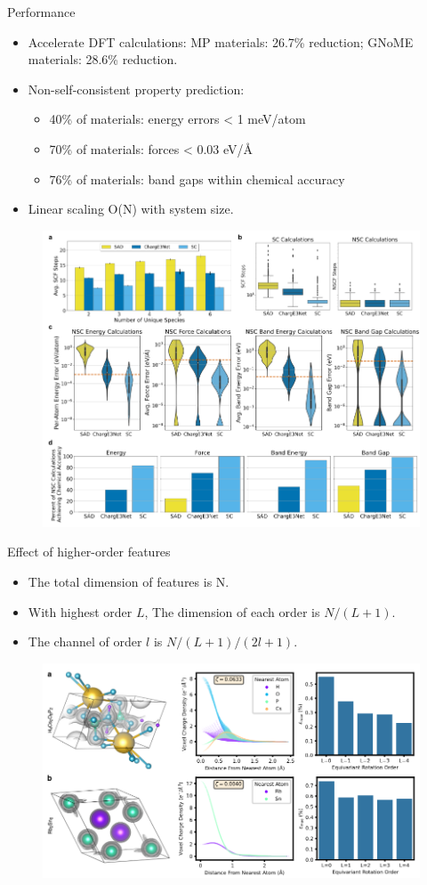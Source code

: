 \begin{frame}{Performance}
    \begin{itemize}
        \item Accelerate DFT calculations: MP materials: 26.7\% reduction;
        GNoME materials: 28.6\% reduction.
        \item Non-self-consistent property prediction:
        \begin{itemize}
            \item 40\% of materials: energy errors < 1 meV/atom
            \item 70\% of materials: forces < 0.03 eV/Å
            \item 76\% of materials: band gaps within chemical accuracy
        \end{itemize}
        \item Linear scaling O(N) with system size.
    \end{itemize}
    \begin{figure}
            \includegraphics[width=.42\textwidth]{figures/charge3net_2.jpg}
            \caption{}
    \end{figure}
\end{frame}


\begin{frame}{Effect of higher-order features}
    \begin{itemize}
        \item The total dimension of features is N.
        \item With highest order $L$, The dimension of each order is $N/(L + 1)$.
        \item The channel of order $l$ is $N / (L + 1) / (2l + 1)$.
    \end{itemize}
    \begin{figure}
            \includegraphics[width=.8\textwidth]{figures/charge3net_3.jpg}
            \caption{}
    \end{figure}
\end{frame}


